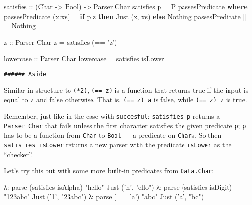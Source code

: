 \documentclass[]{article}
\newenvironment{Shaded}{}{}
\newcommand{\KeywordTok}[1]{\textcolor[rgb]{0.00,0.44,0.13}{\textbf{{#1}}}}
\newcommand{\DataTypeTok}[1]{\textcolor[rgb]{0.56,0.13,0.00}{{#1}}}
\newcommand{\CharTok}[1]{\textcolor[rgb]{0.25,0.44,0.63}{{#1}}}
\newcommand{\StringTok}[1]{\textcolor[rgb]{0.25,0.44,0.63}{{#1}}}
\newcommand{\OtherTok}[1]{\textcolor[rgb]{0.00,0.44,0.13}{{#1}}}
\newcommand{\FunctionTok}[1]{\textcolor[rgb]{0.02,0.16,0.49}{{#1}}}
\newcommand{\NormalTok}[1]{{#1}}
\begin{document}
\begin{Shaded}
\begin{Highlighting}[]
\OtherTok{satisfies ::} \NormalTok{(}\DataTypeTok{Char} \OtherTok{->} \DataTypeTok{Bool}\NormalTok{) }\OtherTok{->} \DataTypeTok{Parser} \DataTypeTok{Char}
\NormalTok{satisfies p }\FunctionTok{=} \DataTypeTok{P} \NormalTok{passesPredicate}
    \KeywordTok{where}
        \NormalTok{passesPredicate (x}\FunctionTok{:}\NormalTok{xs) }\FunctionTok{=}  \KeywordTok{if} \NormalTok{p z}
                                      \KeywordTok{then} \DataTypeTok{Just} \NormalTok{(x, xs)}
                                      \KeywordTok{else} \DataTypeTok{Nothing}
        \NormalTok{passesPredicate []     }\FunctionTok{=}  \DataTypeTok{Nothing}


\OtherTok{z ::} \DataTypeTok{Parser} \DataTypeTok{Char}
\NormalTok{z }\FunctionTok{=} \NormalTok{satisfies (}\FunctionTok{==} \CharTok{'z'}\NormalTok{)}

\OtherTok{lowercase ::} \DataTypeTok{Parser} \DataTypeTok{Char}
\NormalTok{lowercase }\FunctionTok{=} \NormalTok{satisfies isLower}
\end{Highlighting}
\end{Shaded}

\begin{verbatim}
###### Aside
\end{verbatim}

Similar in structure to \texttt{(*2)}, \texttt{(==\ \textquotesingle{}z\textquotesingle{})} is a
function that returns true if the input is equal to \texttt{\textquotesingle{}z\textquotesingle{}}
and false otherwise. That is,
\texttt{(==\ \textquotesingle{}z\textquotesingle{})\ \textquotesingle{}a\textquotesingle{}} is
false, while
\texttt{(==\ \textquotesingle{}z\textquotesingle{})\ \textquotesingle{}z\textquotesingle{}} is true.

Remember, just like in the case with \texttt{succesful}: \texttt{satisfies\ p} returns a
\texttt{Parser\ Char} that fails unless the first character satisfies the given predicate
\texttt{p}; \texttt{p} has to be a function from \texttt{Char} to \texttt{Bool} --- a predicate on
\texttt{Char}s. So then \texttt{satisfies\ isLower} returns a new parser with the predicate
\texttt{isLower} as the ``checker''.

Let's try this out with some more built-in predicates from \texttt{Data.Char}:

\begin{Shaded}
\begin{Highlighting}[]
\NormalTok{λ}\FunctionTok{:} \NormalTok{parse (satisfies isAlpha) }\StringTok{"hello"}
\DataTypeTok{Just} \NormalTok{(}\CharTok{'h'}\NormalTok{, }\StringTok{"ello"}\NormalTok{)}
\NormalTok{λ}\FunctionTok{:} \NormalTok{parse (satisfies isDigit) }\StringTok{"123abc"}
\DataTypeTok{Just} \NormalTok{(}\CharTok{'1'}\NormalTok{, }\StringTok{"23abc"}\NormalTok{)}
\NormalTok{λ}\FunctionTok{:} \NormalTok{parse (}\FunctionTok{==} \CharTok{'a'}\NormalTok{) }\StringTok{"abc"}
\DataTypeTok{Just} \NormalTok{(}\CharTok{'a'}\NormalTok{, }\StringTok{"bc"}\NormalTok{)}
\end{Highlighting}
\end{Shaded}
\end{document}
